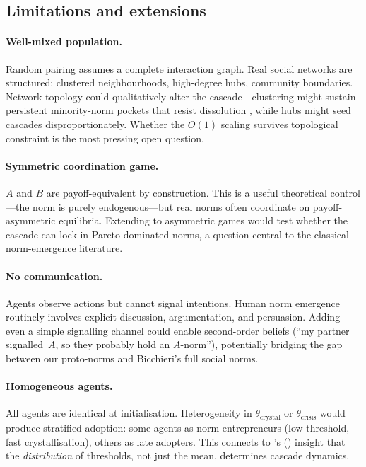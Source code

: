 \documentclass[11pt,a4paper]{article}
\begin{document}
\subsection{Limitations and extensions}
\label{sec:limitations}

\paragraph{Well-mixed population.}  Random pairing assumes a complete interaction graph.  Real social networks are structured: clustered neighbourhoods, high-degree hubs, community boundaries.  Network topology could qualitatively alter the cascade---clustering might sustain persistent minority-norm pockets that resist dissolution \citep{centola2007complex}, while hubs might seed cascades disproportionately.  Whether the $O(1)$ scaling survives topological constraint is the most pressing open question.

\paragraph{Symmetric coordination game.}  $A$ and $B$ are payoff-equivalent by construction.  This is a useful theoretical control---the norm is purely endogenous---but real norms often coordinate on payoff-asymmetric equilibria.  Extending to asymmetric games would test whether the cascade can lock in Pareto-dominated norms, a question central to the classical norm-emergence literature.

\paragraph{No communication.}  Agents observe actions but cannot signal intentions.  Human norm emergence routinely involves explicit discussion, argumentation, and persuasion.  Adding even a simple signalling channel could enable second-order beliefs (``my partner signalled~$A$, so they probably hold an $A$-norm''), potentially bridging the gap between our proto-norms and Bicchieri's full social norms.

\paragraph{Homogeneous agents.}  All agents are identical at initialisation.  Heterogeneity in $\theta_{\mathrm{crystal}}$ or $\theta_{\mathrm{crisis}}$ would produce stratified adoption: some agents as norm entrepreneurs (low threshold, fast crystallisation), others as late adopters.  This connects to \citeauthor{granovetter1978threshold}'s (\citeyear{granovetter1978threshold}) insight that the \emph{distribution} of thresholds, not just the mean, determines cascade dynamics.
\end{document}

